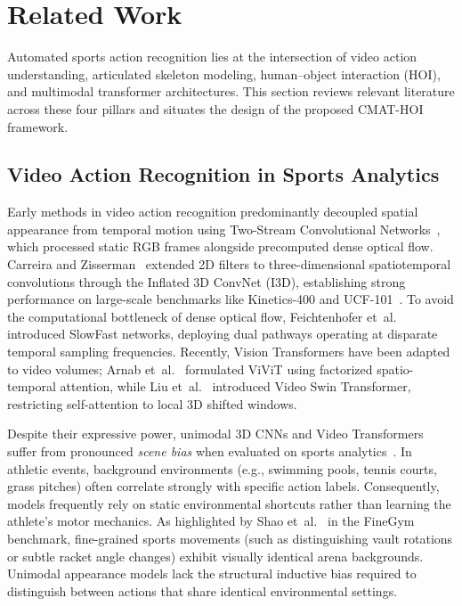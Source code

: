 
\section{Related Work}
\label{sec:related_work}

Automated sports action recognition lies at the intersection of video action understanding, articulated skeleton modeling, human--object interaction (HOI), and multimodal transformer architectures. This section reviews relevant literature across these four pillars and situates the design of the proposed CMAT-HOI framework.

\subsection{Video Action Recognition in Sports Analytics}
Early methods in video action recognition predominantly decoupled spatial appearance from temporal motion using Two-Stream Convolutional Networks~\cite{simonyan2014two}, which processed static RGB frames alongside precomputed dense optical flow. Carreira and Zisserman~\cite{carreira2017quo} extended 2D filters to three-dimensional spatiotemporal convolutions through the Inflated 3D ConvNet (I3D), establishing strong performance on large-scale benchmarks like Kinetics-400 and UCF-101~\cite{soomro2012ucf101}. To avoid the computational bottleneck of dense optical flow, Feichtenhofer et~al.~\cite{feichtenhofer2019slowfast} introduced SlowFast networks, deploying dual pathways operating at disparate temporal sampling frequencies. Recently, Vision Transformers have been adapted to video volumes; Arnab et~al.~\cite{arnab2021vivit} formulated ViViT using factorized spatio-temporal attention, while Liu et~al.~\cite{liu2022video} introduced Video Swin Transformer, restricting self-attention to local 3D shifted windows.

Despite their expressive power, unimodal 3D CNNs and Video Transformers suffer from pronounced \textit{scene bias} when evaluated on sports analytics~\cite{host2022overview}. In athletic events, background environments (e.g., swimming pools, tennis courts, grass pitches) often correlate strongly with specific action labels. Consequently, models frequently rely on static environmental shortcuts rather than learning the athlete's motor mechanics. As highlighted by Shao et~al.~\cite{shao2020finegym} in the FineGym benchmark, fine-grained sports movements (such as distinguishing vault rotations or subtle racket angle changes) exhibit visually identical arena backgrounds. Unimodal appearance models lack the structural inductive bias required to distinguish between actions that share identical environmental settings.

